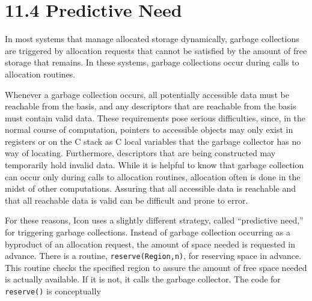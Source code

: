 \section[11.4 Predictive Need]{11.4 Predictive Need}

In most systems that manage allocated storage dynamically, garbage
collections are triggered by allocation requests that cannot be
satisfied by the amount of free storage that remains. In these
systems, garbage collections occur during calls to allocation routines.

Whenever a garbage collection occurs, all potentially accessible data
must be reachable from the basis, and any descriptors that are
reachable from the basis must contain valid data. These requirements
pose serious difficulties, since, in the normal course of computation,
pointers to accessible objects may only exist in registers or on the C
stack as C local variables that the garbage collector has no way of
locating. Furthermore, descriptors that are being constructed may
temporarily hold invalid data. While it is helpful to know that
garbage collection can occur only during calls to allocation routines,
allocation often is done in the midst of other computations. Assuring
that all accessible data is reachable and that all reachable data is
valid can be difficult and prone to error.

For these reasons, Icon uses a slightly different strategy, called
``predictive need,'' for triggering garbage collections. Instead of
garbage collection occurring as a byproduct of an allocation request,
the amount of space needed is requested in advance. There is a
routine, \texttt{reserve(Region,n)}, for reserving space in
advance. This routine checks the specified region to assure the amount
of free space needed is actually available. If it is not, it calls the
garbage collector. The code for \texttt{reserve()} is conceptually

\goodbreak
{}

